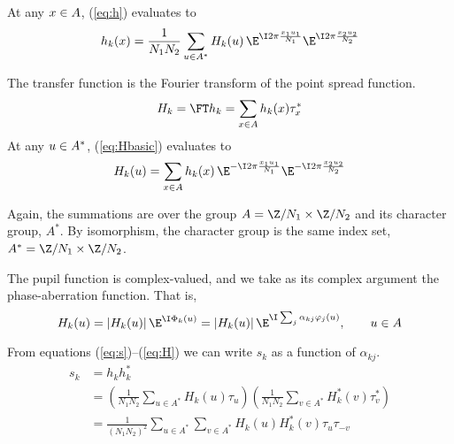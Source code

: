 At any $x \in A$, (\ref{eq:h}) evaluates to 
\[
h_k(x) = 
\frac{1}{N_1N_2} \sum_{u\in \groupA^*} H_k(u)\,
\E^{\I 2\pi \frac{x_1u_1}{N_1}}\E^{\I 2\pi \frac{x_2u_2}{N_2}}
\]

The transfer function is the Fourier transform of the point spread function.
\begin{equation}\label{eq:Hbasic}
H_k = \FT h_k = \sum_{x\in \groupA} h_k(x)\tau_x^*
\end{equation}
At any $u \in A^*$, (\ref{eq:Hbasic}) evaluates to
\[
H_k(u) = \sum_{x \in \groupA} h_k(x)\,
\E^{-\I 2\pi \frac{x_1u_1}{N_1}}\E^{-\I 2\pi \frac{x_2u_2}{N_2}}
\]

Again, the summations are over the group $A = \Z/N_1 \times \Z/N_2$ and its
character group, $A^*$.  By isomorphism, the character group is the same index set,
$A^* = \Z/N_1 \times \Z/N_2$. 

The pupil function is complex-valued, and we take as its complex argument the
phase-aberration function.  That is, 
\begin{equation}\label{eq:H}
H_k(u) = |H_k(u)|\,\E^{\I \Phi_k(u)} = |H_k(u)|\,\E^{\I \sum_j \alpha_{kj}\varphi_j(u)}, \qquad u\in \groupA
\end{equation}

From equations (\ref{eq:s})--(\ref{eq:H}) we can write $s_k$ as a function of $\alpha_{kj}$.
\begin{align}\label{eq:sk}
s_k &=  h_k h_k^* \nonumber\\
&= \left(\frac{1}{N_1N_2}\sum_{u\in A^*} H_k(u) \tau_u\right)
\left( \frac{1}{N_1N_2}\sum_{v\in A^*}H_k^*(v)\tau_v^*\right) \nonumber\\
&=\frac{1}{(N_1N_2)^2}\sum_{u\in A^*} \sum_{v\in A^*} H_k(u)H_k^*(v)\tau_{u}\tau_{-v}
\end{align}

